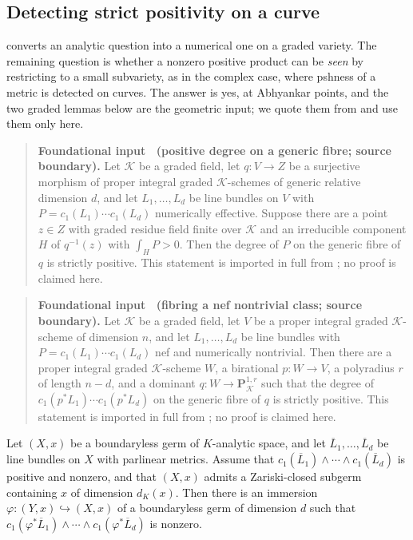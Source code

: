 \subsection{Detecting strict positivity on a curve}
\label{sec:ch17-detection}

 converts an analytic question into a
numerical one on a graded variety.  The remaining question is whether a
nonzero positive product can be \emph{seen} by restricting to a small
subvariety, as in the complex case, where pshness of a metric is detected on
curves.  The answer is yes, at Abhyankar points, and the two graded lemmas
below are the geometric input; we quote them from
\cite[\S18.9]{CLD25} and use them only here.

\label{lem:ch17-detect-fibration}
\begin{quote}
\textbf{Foundational input \thelemma\ (positive degree on a generic fibre;
source boundary).}
Let $\mathcal K$ be a graded field, let $q:V\to Z$ be a surjective
morphism of proper integral graded $\mathcal K$-schemes of generic
relative dimension $d$, and let $L_1,\dots,L_d$ be line bundles on
$V$ with $P=c_1(L_1)\cdots c_1(L_d)$ numerically effective.  Suppose
there are a point $z\in Z$ with graded residue field finite over
$\mathcal K$ and an irreducible component $H$ of $q^{-1}(z)$ with
$\int_HP>0$.  Then the degree of $P$ on the generic fibre of $q$ is
strictly positive.
This statement is imported in full from \cite[Lemma~18.9.1]{CLD25}; no
proof is claimed here.
\end{quote}

\label{lem:ch17-detect-model}
\begin{quote}
\textbf{Foundational input \thelemma\ (fibring a nef nontrivial class;
source boundary).}
Let $\mathcal K$ be a graded field, let $V$ be a proper integral graded
$\mathcal K$-scheme of dimension $n$, and let $L_1,\dots,L_d$ be line
bundles with $P=c_1(L_1)\cdots c_1(L_d)$ nef and numerically nontrivial.
Then there are a proper integral graded $\mathcal K$-scheme $W$, a
birational $p:W\to V$, a polyradius $r$ of length $n-d$, and a
dominant $q:W\to\mathbf P^{1,r}_{\mathcal K}$ such that the degree of
$c_1(p^*L_1)\cdots c_1(p^*L_d)$ on the generic fibre of $q$ is strictly
positive.
This statement is imported in full from \cite[Proposition~18.9.2]{CLD25};
no proof is claimed here.
\end{quote}

\begin{theorem}
\label{thm:ch17-detect-subvariety}
Let $(X,x)$ be a boundaryless germ of $K$-analytic space, and let
$\overline L_1,\dots,\overline L_d$ be line bundles on $X$ with
parlinear metrics.  Assume that
$c_1(\overline L_1)\wedge\cdots\wedge c_1(\overline L_d)$ is positive and
nonzero, and that $(X,x)$ admits a Zariski-closed subgerm containing $x$ of dimension
$d_K(x)$.  Then there is an immersion $\varphi:(Y,x)\hookrightarrow(X,x)$
of a boundaryless germ of dimension $d$ such that
$c_1(\varphi^*\overline L_1)\wedge\cdots\wedge c_1(\varphi^*\overline L_d)$
is nonzero.
\end{theorem}

